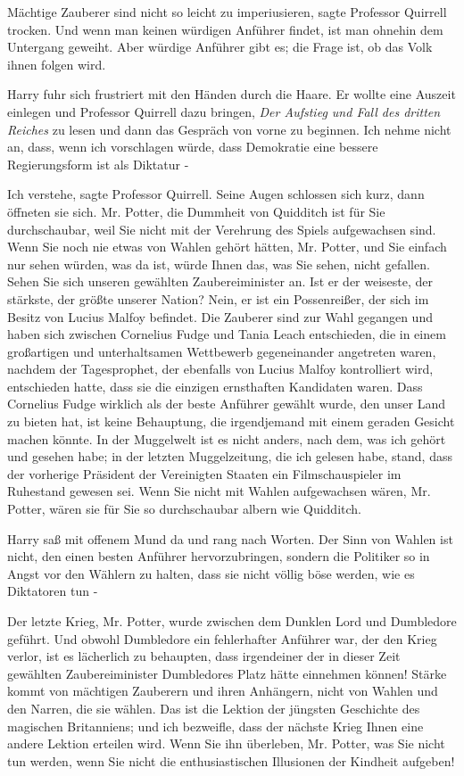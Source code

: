 \glqq{}Mächtige Zauberer sind nicht so leicht zu imperiusieren\grqq{}, sagte
Professor Quirrell trocken. \glqq{}Und wenn man keinen würdigen Anführer findet,
ist man ohnehin dem Untergang geweiht. Aber würdige Anführer gibt es; die Frage
ist, ob das Volk ihnen folgen wird.\grqq{}

Harry fuhr sich frustriert mit den Händen durch die Haare. Er wollte eine
Auszeit einlegen und Professor Quirrell dazu bringen, \emph{Der Aufstieg und
Fall des dritten Reiches} zu lesen und dann das Gespräch von vorne zu beginnen.
\glqq{}Ich nehme nicht an, dass, wenn ich vorschlagen würde, dass Demokratie eine
bessere Regierungsform ist als Diktatur -\grqq{}

\glqq{}Ich verstehe\grqq{}, sagte Professor Quirrell. Seine Augen schlossen sich
kurz, dann öffneten sie sich. \glqq{}Mr. Potter, die Dummheit von Quidditch ist
für Sie durchschaubar, weil Sie nicht mit der Verehrung des Spiels aufgewachsen
sind. Wenn Sie noch nie etwas von Wahlen gehört hätten, Mr. Potter, und Sie
einfach nur sehen würden, was da ist, würde Ihnen das, was Sie sehen, nicht
gefallen. Sehen Sie sich unseren gewählten Zaubereiminister an. Ist er der
weiseste, der stärkste, der größte unserer Nation? Nein, er ist ein
Possenreißer, der sich im Besitz von Lucius Malfoy befindet. Die Zauberer sind
zur Wahl gegangen und haben sich zwischen Cornelius Fudge und Tania Leach
entschieden, die in einem großartigen und unterhaltsamen Wettbewerb
gegeneinander angetreten waren, nachdem der Tagesprophet, der ebenfalls von
Lucius Malfoy kontrolliert wird, entschieden hatte, dass sie die einzigen
ernsthaften Kandidaten waren. Dass Cornelius Fudge wirklich als der beste
Anführer gewählt wurde, den unser Land zu bieten hat, ist keine Behauptung, die
irgendjemand mit einem geraden Gesicht machen könnte. In der Muggelwelt ist es
nicht anders, nach dem, was ich gehört und gesehen habe; in der letzten
Muggelzeitung, die ich gelesen habe, stand, dass der vorherige Präsident der
Vereinigten Staaten ein Filmschauspieler im Ruhestand gewesen sei. Wenn Sie
nicht mit Wahlen aufgewachsen wären, Mr. Potter, wären sie für Sie so
durchschaubar albern wie Quidditch.\grqq{}

Harry saß mit offenem Mund da und rang nach Worten. \glqq{}Der Sinn von Wahlen
ist nicht, den einen besten Anführer hervorzubringen, sondern die Politiker so
in Angst vor den Wählern zu halten, dass sie nicht völlig böse werden, wie es
Diktatoren tun -\grqq{}

\glqq{}Der letzte Krieg, Mr. Potter, wurde zwischen dem Dunklen Lord und
Dumbledore geführt. Und obwohl Dumbledore ein fehlerhafter Anführer war, der den
Krieg verlor, ist es lächerlich zu behaupten, dass irgendeiner der in dieser
Zeit gewählten Zaubereiminister Dumbledores Platz hätte einnehmen können! Stärke
kommt von mächtigen Zauberern und ihren Anhängern, nicht von Wahlen und den
Narren, die sie wählen. Das ist die Lektion der jüngsten Geschichte des
magischen Britanniens; und ich bezweifle, dass der nächste Krieg Ihnen eine
andere Lektion erteilen wird. Wenn Sie ihn überleben, Mr. Potter, was Sie nicht
tun werden, wenn Sie nicht die enthusiastischen Illusionen der Kindheit
aufgeben!\grqq{}

